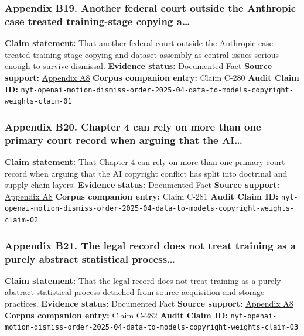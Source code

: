 \documentclass[
  american,
  11pt,
  letterpaper,
]{article}
\begin{document}
\subsubsection{Appendix B19. Another federal court outside the Anthropic
case treated training-stage copying
a\ldots{}}\label{appendix-b19-another-federal-court-outside-the-anthropic-case-treated-training-stage-copying-a}

\textbf{Claim statement:} That another federal court outside the
Anthropic case treated training-stage copying and dataset assembly as
central issues serious enough to survive dismissal. \textbf{Evidence
status:} Documented Fact \textbf{Source support:}
\hyperref[appendix-a8-the-new-york-times-company-v-microsoft-corporation-et-al-opinion-on-motions-to-dismiss]{Appendix
A8} \textbf{Corpus companion entry:} Claim C-280 \textbf{Audit Claim
ID:}
\texttt{nyt-openai-motion-dismiss-order-2025-04-data-to-models-copyright-weights-claim-01}

\subsubsection{Appendix B20. Chapter 4 can rely on more than one primary
court record when arguing that the
AI\ldots{}}\label{appendix-b20-chapter-4-can-rely-on-more-than-one-primary-court-record-when-arguing-that-the-ai}

\textbf{Claim statement:} That Chapter 4 can rely on more than one
primary court record when arguing that the AI copyright conflict has
split into doctrinal and supply-chain layers. \textbf{Evidence status:}
Documented Fact \textbf{Source support:}
\hyperref[appendix-a8-the-new-york-times-company-v-microsoft-corporation-et-al-opinion-on-motions-to-dismiss]{Appendix
A8} \textbf{Corpus companion entry:} Claim C-281 \textbf{Audit Claim
ID:}
\texttt{nyt-openai-motion-dismiss-order-2025-04-data-to-models-copyright-weights-claim-02}

\subsubsection{Appendix B21. The legal record does not treat training as
a purely abstract statistical
process\ldots{}}\label{appendix-b21-the-legal-record-does-not-treat-training-as-a-purely-abstract-statistical-process}

\textbf{Claim statement:} That the legal record does not treat training
as a purely abstract statistical process detached from source
acquisition and storage practices. \textbf{Evidence status:} Documented
Fact \textbf{Source support:}
\hyperref[appendix-a8-the-new-york-times-company-v-microsoft-corporation-et-al-opinion-on-motions-to-dismiss]{Appendix
A8} \textbf{Corpus companion entry:} Claim C-282 \textbf{Audit Claim
ID:}
\texttt{nyt-openai-motion-dismiss-order-2025-04-data-to-models-copyright-weights-claim-03}
\end{document}
